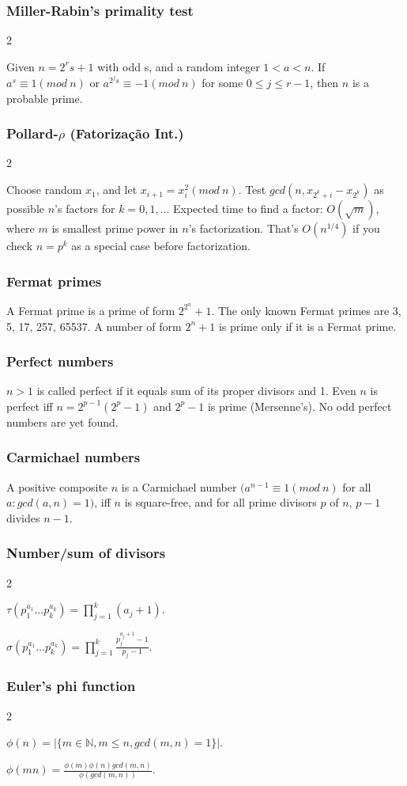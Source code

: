 \documentclass[a4paper,12pt]{article}
\newcommand\includefile[4]{
  \subsubsection{#2}
  \begin{multicols}{2}
    
  \end{multicols}
}
\begin{document}
\includefile{c++}{Miller-Rabin's primality test}{math}{miller_rabin.cpp}
Given $n = 2^{r}s + 1$ with odd s, and a random integer $1 < a < n$. If $a^{s} \equiv 1 (mod\ n)$ or $a^{2^{j}s} \equiv -1 (mod\ n)$ for some $0 \leq j \leq r-1$, then $n$ is a probable prime.

\newpage
\includefile{c++}{Pollard-$\rho$ (Fatorização Int.)}{math}{pollard.cpp}

Choose random $x_1$, and let $x_{i+1} = x_{i}^{2} (mod\ n)$. Test $gcd(n,x_{2^k+i} - x_{2^k})$ as possible $n$'s factors for $k = 0, 1, ...$ Expected time to find a factor: $O(\sqrt{m})$, where $m$ is smallest prime power in $n$'s factorization. That's $O(n^{1/4})$ if you check $n = p^k$ as a special case before factorization.

\subsubsection{Fermat primes}
A Fermat prime is a prime of form $2^{2^n} + 1$. The only known Fermat primes are 3, 5, 17, 257, 65537. A number of form $2^{n} + 1$ is prime only if it is a Fermat prime.

\subsubsection{Perfect numbers}
$n > 1$ is called perfect if it equals sum of its proper divisors and 1. Even $n$ is perfect iff $n = 2^{p-1}(2^{p} - 1)$ and $2^{p} - 1$ is prime (Mersenne’s). No odd perfect numbers are yet found.

\subsubsection{Carmichael numbers}
A positive composite $n$ is a Carmichael number $(a^{n-1} \equiv 1 (mod\ n)$ for all $a: gcd(a,n) = 1)$, iff $n$ is square-free, and for all prime divisors $p$ of $n$, $p-1$ divides $n-1$.

\newpage
\includefile{c++}{Number/sum of divisors}{meh}{sigma.cpp}

$\tau(p_1^{a_1}...p_k^{a_k}) = \prod_{j=1}^{k}(a_j + 1).$

$\sigma(p_1^{a_1}...p_k^{a_k}) = \prod_{j=1}^{k}\frac{p_{j}^{a_j+1}-1}{p_j-1}.$

\includefile{c++}{Euler's phi function}{meh}{phi.cpp}

$\phi(n) = |\{m \in \mathbb{N}, m \leq n, gcd(m,n) = 1\}|$.

$\phi(mn) = \frac{\phi(m)\phi(n)gcd(m,n)}{\phi(gcd(m,n))}$.
\end{document}
